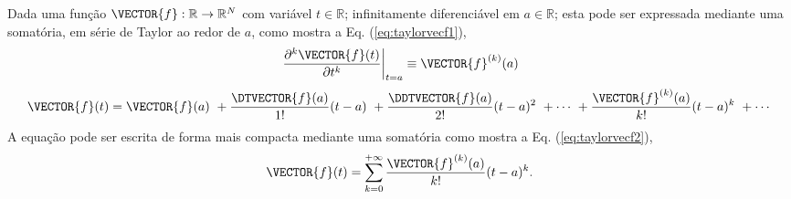 \begin{proposition}\label{prop:taylorvecf}
Dada uma função $\VECTOR{f}:\mathbb{R}\rightarrow \mathbb{R}^{N}$ com variável $t \in \mathbb{R}$;
infinitamente diferenciável em $a \in \mathbb{R}$;
esta pode ser expressada mediante uma somatória, em série de Taylor 
\cite[pp. 264]{joag2016introduction}
ao redor de $a$, como
mostra a Eq. (\ref{eq:taylorvecf1}),
\begin{equation}\label{eq:taylorvecf0a}
\left.\frac{\partial^k \VECTOR{f}(t)}{\partial t^k}\right|_{t=a}\equiv \VECTOR{f}^{(k)}(a) 
\end{equation}
\begin{equation}\label{eq:taylorvecf1}
  \VECTOR{f}(t)=\VECTOR{f}(a)
      ~+\frac{\DTVECTOR{f}(a)}{1!} (t-a)
      ~+\frac{\DDTVECTOR{f}(a)}{2!} (t-a)^{2}
      ~+\cdots 
      ~+\frac{\VECTOR{f}^{(k)}(a)}{k!} (t-a)^{k}
      ~+\cdots 
\end{equation}
A equação pode ser escrita de forma mais compacta mediante uma somatória  como mostra a Eq. (\ref{eq:taylorvecf2}),
\begin{equation}\label{eq:taylorvecf2}
  \VECTOR{f}(t)=\sum\limits_{k=0}^{+\infty} \frac{\VECTOR{f}^{(k)}(a)}{k!} (t-a)^{k}.
\end{equation}
\end{proposition}

